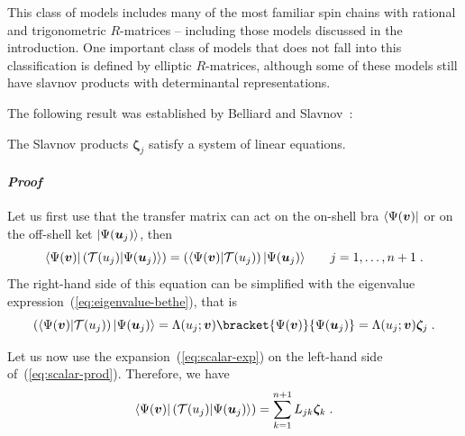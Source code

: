 \documentclass[a4paper,11pt]{amsart}
\begin{document}
This class of models includes many of the most familiar spin chains
with rational and trigonometric \(R\)-matrices -- including those
models discussed in the introduction. One important class of models
that does not fall into this classification is defined by
elliptic \(R\)-matrices, although some of these models still have slavnov
products with determinantal representations.

The following result was established by Belliard and Slavnov~\cite{Belliard:2019bfz}:

\begin{proposition}
The Slavnov products \(\bm{\zeta}_j\) satisfy a system of linear
equations.
\end{proposition}
\paragraph{\textbf{\emph{Proof}}} Let us first use that the
transfer matrix can act on the on-shell bra \(\langle\Psi(\bm{v})\rvert\)
or on the off-shell ket \(\lvert\Psi(\bm{u}_j)\rangle\), then  
\begin{equation}
\label{eq:scalar-prod}
  \langle\Psi(\bm{v})\rvert \left(\mathcal{T}(u_j)\lvert\Psi(\bm{u}_j)\rangle \right) =
  \left(\langle\Psi(\bm{v})\rvert\mathcal{T}(u_j)\right)\lvert\Psi(\bm{u}_j)\rangle
  \qquad j =1, \dots, n+1\; .
\end{equation}
The right-hand side of this equation can be simplified with the eigenvalue
expression~(\ref{eq:eigenvalue-bethe}), that is
\begin{equation}
  \left(\bra{\Psi(\bm{v})}\mathcal{T}(u_j)\right)\ket{\Psi(\bm{u}_j)}  =
\Lambda(u_j; \bm{v}) \bracket{\Psi(\bm{v})}{\Psi(\bm{u}_j)} = 
\Lambda(u_j; \bm{v}) \bm{\zeta}_j\; . 
\end{equation}

Let us now use the expansion~(\ref{eq:scalar-exp}) on the left-hand
side of~(\ref{eq:scalar-prod}). Therefore, we have
\begin{equation}
  \langle\Psi(\bm{v})\rvert \left(\mathcal{T}(u_j)\lvert\Psi(\bm{u}_j)\rangle \right) =
  \sum_{k=1}^{n+1} L_{jk} \bm{\zeta}_k \; .
\end{equation}
\end{document}
